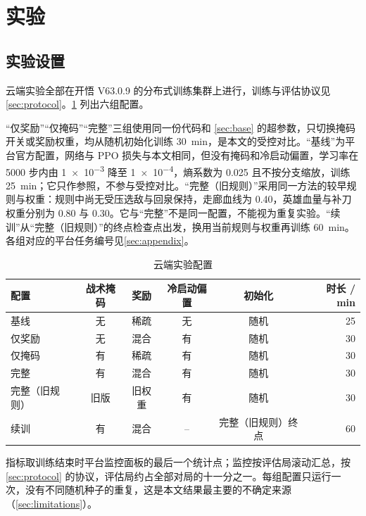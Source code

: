 \section{实验}
\label{sec:experiments}

\subsection{实验设置}
\label{sec:setup}

云端实验全部在开悟 V63.0.9 的分布式训练集群上进行，训练与评估协议见 \cref{sec:protocol}。\cref{tab:configs} 列出六组配置。

“仅奖励”“仅掩码”“完整”三组使用同一份代码和 \cref{sec:base} 的超参数，只切换掩码开关或奖励权重，均从随机初始化训练 \qty{30}{\minute}，是本文的受控对比。“基线”为平台官方配置，网络与 PPO 损失与本文相同，但没有掩码和冷启动偏置，学习率在 \num{5000} 步内由 \num{1e-3} 降至 \num{1e-4}，熵系数为 \num{0.025} 且不按分支缩放，训练 \qty{25}{\minute}；它只作参照，不参与受控对比。“完整（旧规则）”采用同一方法的较早规则与权重：规则中尚无受压选敌与回泉保持，走廊血线为 \num{0.40}，英雄血量与补刀权重分别为 \num{0.80} 与 \num{0.30}。它与“完整”不是同一配置，不能视为重复实验。“续训”从“完整（旧规则）”的终点检查点出发，换用当前规则与权重再训练 \qty{60}{\minute}。各组对应的平台任务编号见\cref{sec:appendix}。

\begin{table}[htbp]
  \centering
  \caption{云端实验配置}
  \label{tab:configs}
  \begin{tabular}{lccccr}
    \toprule
    配置 & 战术掩码 & 奖励 & 冷启动偏置 & 初始化 & 时长 / min \\
    \midrule
    基线 & 无 & 稀疏 & 无 & 随机 & 25 \\
    仅奖励 & 无 & 混合 & 有 & 随机 & 30 \\
    仅掩码 & 有 & 稀疏 & 有 & 随机 & 30 \\
    完整 & 有 & 混合 & 有 & 随机 & 30 \\
    完整（旧规则） & 旧版 & 旧权重 & 有 & 随机 & 30 \\
    续训 & 有 & 混合 & -- & 完整（旧规则）终点 & 60 \\
    \bottomrule
  \end{tabular}
\end{table}

指标取训练结束时平台监控面板的最后一个统计点；监控按评估局滚动汇总，按 \cref{sec:protocol} 的协议，评估局约占全部对局的十一分之一。每组配置只运行一次，没有不同随机种子的重复，这是本文结果最主要的不确定来源（\cref{sec:limitations}）。

